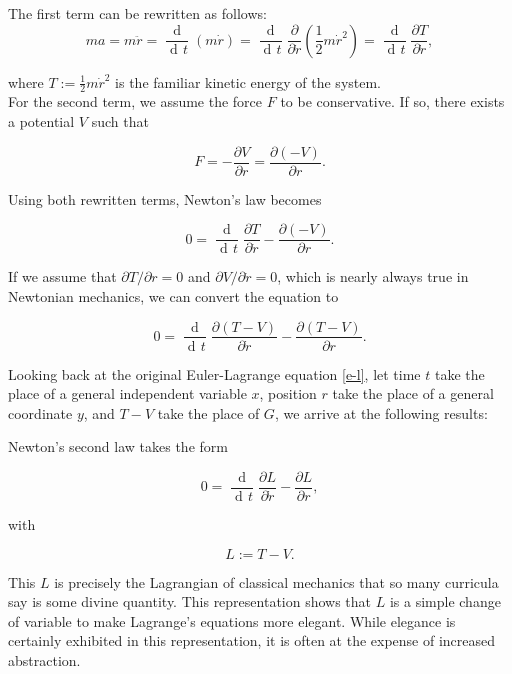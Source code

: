 \documentclass[prb,preprint]{revtex4-1}
\DeclareMathOperator{\dd}{d\!}
\DeclareMathOperator{\ddd}{\mathrm{d}}
\begin{document}
The first term can be rewritten as follows:
\begin{equation}
ma = m \ddot{r} = \frac{\ddd}{\dd t} (m \dot{r})
= \frac{\ddd}{\dd t} \frac{\partial}{\partial \dot{r}} \left(\frac{1}{2} m \dot{r}^2 \right)
= \frac{\ddd}{\dd t} \frac{\partial T}{\partial \dot{r}},
\end{equation}

where $T:=\frac{1}{2} m \dot{r}^2$ is the familiar kinetic energy of the system. \\

For the second term, we assume the force $F$ to be conservative. If so, there exists a potential $V$ such that

\begin{equation}
F = - \frac{\partial V}{\partial r} = \frac{\partial (-V)}{\partial r}.
\end{equation}

Using both rewritten terms, Newton's law becomes


\begin{equation}
0 = \frac{\ddd}{\dd t} \frac{\partial T}{\partial \dot{r}} - \frac{\partial (-V)}{\partial r}.
\end{equation}


If we assume that $\partial T/ \partial r = 0$ and $\partial V / \partial \dot{r} = 0$, which is nearly always true in Newtonian mechanics, we can convert the equation to


\begin{equation}
0 = \frac{\ddd}{\dd t} \frac{\partial (T-V)}{\partial \dot{r}} - \frac{\partial (T-V)}{\partial r}.
\end{equation}

Looking back at the original Euler-Lagrange equation \eqref{e-l}, let time $t$ take the place of a general independent variable $x$, position $r$ take the place of a general coordinate $y$, and $T-V$ take the place of $G$, we arrive at the following results:

Newton's second law takes the form

\begin{equation}
0 = \frac{\ddd}{\dd t} \frac{\partial L}{\partial \dot{r}} - \frac{\partial L}{\partial r},
\end{equation}

with

\begin{equation}
 L := T-V.
\end{equation}

This $L$ is precisely the Lagrangian of classical mechanics that so many curricula say is some divine quantity. This representation shows that $L$ is a simple change of variable to make Lagrange's equations more elegant. While elegance is certainly exhibited in this representation, it is often at the expense of increased abstraction.
\end{document}
